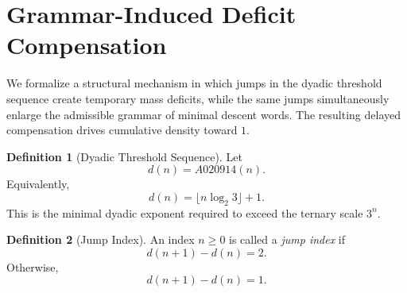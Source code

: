 \documentclass[12pt, oneside]{article}
\numberwithin{equation}{section}
\theoremstyle{definition}
\newtheorem{definition}{Definition}[section]
\theoremstyle{plain}
\newtheorem{theorem}{Theorem}[section]
\newtheorem{corollary}[theorem]{Corollary}
\theoremstyle{remark}
\begin{document}



\section{Grammar-Induced Deficit Compensation}
\label{sec:grammar-compensation}

We formalize a structural mechanism in which jumps in the dyadic
threshold sequence create temporary mass deficits, while the same jumps
simultaneously enlarge the admissible grammar of minimal descent words.
The resulting delayed compensation drives cumulative density toward $1$.


\begin{definition}[Dyadic Threshold Sequence]
Let
\[
d(n)=A020914(n).
\]
Equivalently,
\[
d(n)=\lfloor n\log_2 3 \rfloor + 1.
\]
This is the minimal dyadic exponent required to exceed the ternary scale
$3^n$.
\end{definition}


\begin{definition}[Jump Index]
An index $n\ge0$ is called a \emph{jump index} if
\[
d(n+1)-d(n)=2.
\]
Otherwise,
\[
d(n+1)-d(n)=1.
\]
\end{definition}
\end{document}

